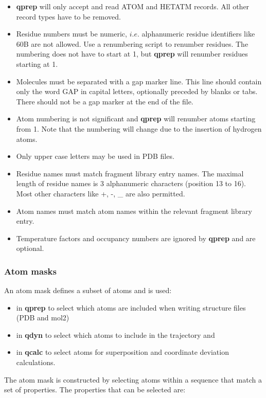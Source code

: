 \documentclass[a4paper,10pt]{article}
\begin{document}
\begin{itemize}
\item  \textbf{qprep}  will  only  accept and  read  ATOM  and  HETATM
records. All other record types have to be removed.
\item  Residue numbers  must be  numeric, $i.e.$  alphanumeric residue
identifiers like 60B  are not allowed.  Use a  renumbering script to
renumber residues.  The  numbering does not have to start  at 1, but
\textbf{qprep} will renumber residues starting at 1.
\item Molecules  must be separated with  a gap marker line.  This line
should  contain  only the  word  GAP  in capital  letters,  optionally
preceded by blanks  or tabs. There should  not be a gap  marker at the
end of the file.
\item  Atom  numbering  is  not significant  and  \textbf{qprep}  will
renumber atoms  starting from 1.  Note that the numbering  will change
due to the insertion of hydrogen atoms.
\item Only upper case letters may be used in PDB files.
\item  Residue names  must  match fragment  library  entry names.  The
maximal length of residue names is 3 alphanumeric characters (position
13 to 16). Most other characters like +, -, {\_} are also permitted.
\item Atom  names must match  atom names within the  relevant fragment
library entry.
\item  Temperature  factors  and  occupancy  numbers  are  ignored  by
\textbf{qprep} and are optional.
\end{itemize}

\subsubsection{Atom masks}\label{subsubsec:atom_masks}
An atom mask defines a subset of atoms and is used:
\begin{itemize}
\item in \textbf{qprep} to select which atoms are included when writing
structure files (PDB and mol2)
\item in \textbf{qdyn} to select which atoms
to include in the trajectory and
\item in \textbf{qcalc} to select atoms
for superposition and coordinate deviation calculations.
\end{itemize}
The atom mask is constructed by selecting atoms within a sequence
that match a set of properties. The properties that can be
selected are:
\end{document}
